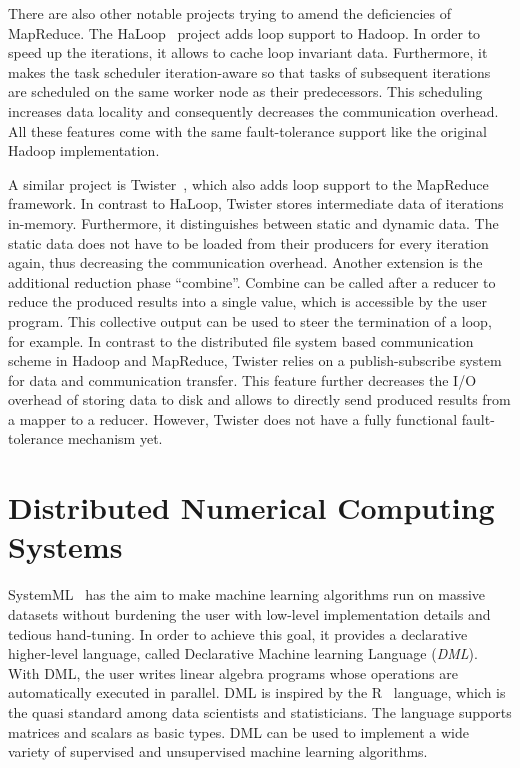 There are also other notable projects trying to amend the deficiencies of MapReduce.
The HaLoop~\cite{bu:pve2010a} project adds loop support to Hadoop.
In order to speed up the iterations, it allows to cache loop invariant data.
Furthermore, it makes the task scheduler iteration-aware so that tasks of subsequent iterations are scheduled on the same worker node as their predecessors.
This scheduling increases data locality and consequently decreases the communication overhead.
All these features come with the same fault-tolerance support like the original Hadoop implementation.

A similar project is Twister~\cite{ekanayake:2010a}, which also adds loop support to the MapReduce framework.
In contrast to HaLoop, Twister stores intermediate data of iterations in-memory.
Furthermore, it distinguishes between static and dynamic data.
The static data does not have to be loaded from their producers for every iteration again, thus decreasing the communication overhead.
Another extension is the additional reduction phase ``combine''.
Combine can be called after a reducer to reduce the produced results into a single value, which is accessible by the user program.
This collective output can be used to steer the termination of a loop, for example.
In contrast to the distributed file system based communication scheme in Hadoop and MapReduce, Twister relies on a publish-subscribe system for data and communication transfer.
This feature further decreases the I/O overhead of storing data to disk and allows to directly send produced results from a mapper to a reducer.
However, Twister does not have a fully functional fault-tolerance mechanism yet.

\section{Distributed Numerical Computing Systems}

SystemML~\cite{ghoting:2011a} has the aim to make machine learning algorithms run on massive datasets without burdening the user with low-level implementation details and tedious hand-tuning.
In order to achieve this goal, it provides a declarative higher-level language, called Declarative Machine learning Language (\emph{DML}).
With DML, the user writes linear algebra programs whose operations are automatically executed in parallel.
DML is inspired by the R~\cite{r:1993a} language, which is the quasi standard among data scientists and statisticians.
The language supports matrices and scalars as basic types.
DML can be used to implement a wide variety of supervised and unsupervised machine learning algorithms.

